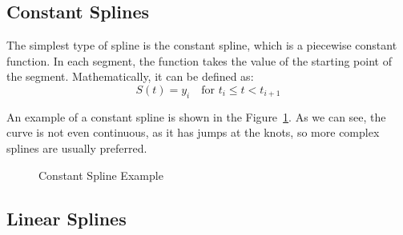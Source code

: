 \subsection{Constant Splines}

The simplest type of spline is the constant spline, which is a piecewise constant function. In each segment, the function takes the value of the starting point of the segment. Mathematically, it can be defined as:
\[S(t) = y_i \quad \text{for } t_i \leq t < t_{i+1}\]

An example of a constant spline is shown in the Figure~\ref{fig:constant_spline}. As we can see, the curve is not even continuous, as it has jumps at the knots, so more complex splines are usually preferred.
\begin{figure}
    \centering
    \caption{Constant Spline Example}
    \label{fig:constant_spline}
\end{figure}


\subsection{Linear Splines}

